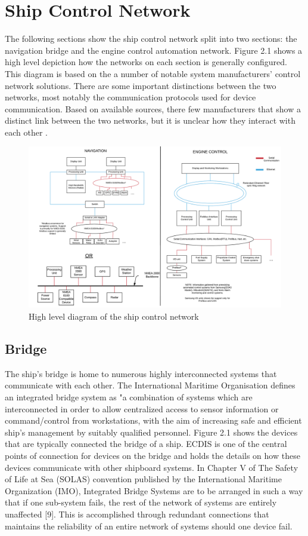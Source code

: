 \documentclass{report}
\begin{document}
\section{Ship Control Network}
The following sections show the ship control network split into two sections: the navigation bridge and the engine control automation network. Figure 2.1 shows a high level depiction how the networks on each section is generally configured. This diagram is based on the a number of notable system manufacturers' control network solutions. There are some important distinctions between the two networks, most notably the communication protocols used for device communication. Based on available sources, there few manufacturers that show a distinct link between the two networks, but it is unclear how they interact with each other .  

\begin{figure}[h]
    \centering
    \includegraphics[width=12cm]{Images and Figures/High-Level Diagram.PNG}
    \caption{High level diagram of the ship control network }
    \label{fig:Navigation Bridge}
\end{figure}

\subsection{Bridge}
The ship's bridge is home to numerous highly interconnected systems that communicate with each other. The International Maritime Organisation defines an integrated bridge system as "a combination of systems which are interconnected in order to allow centralized access to sensor information or command/control from workstations, with the aim of increasing safe and efficient ship's management by suitably qualified personnel. Figure 2.1 shows the devices that are typically connected the bridge of a ship. ECDIS is one of the central points of connection for devices on the bridge and holds the details on how these devices communicate with other shipboard systems.
\vspace{5mm} %
In Chapter V of The Safety of Life at Sea (SOLAS) convention published by the International Maritime Organization (IMO), Integrated Bridge Systems are to be arranged in such a way that if one sub-system fails, the rest of the network of systems are entirely unaffected [9]. This is accomplished through redundant connections that maintains the reliability of an entire network of systems should one device fail.
\end{document}
